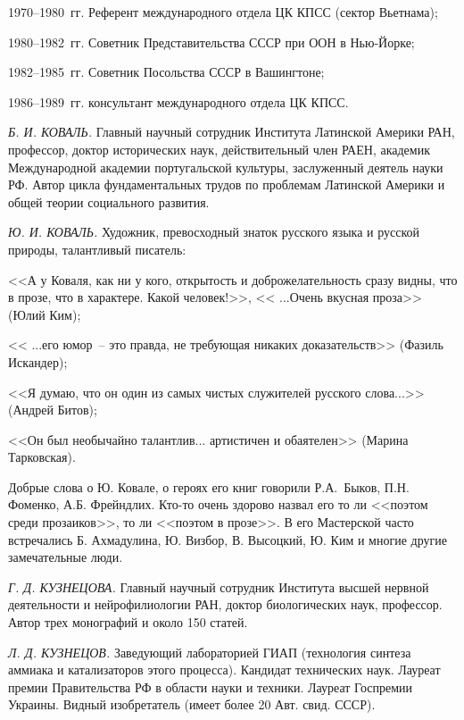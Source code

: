 1970--1980~гг. Референт международного отдела ЦК КПСС (сектор Вьетнама);

1980--1982~гг. Советник  Представительства СССР при ООН в Нью-Йорке;

1982--1985~гг. Советник Посольства СССР в Вашингтоне;

1986--1989~гг. консультант международного отдела ЦК КПСС.

\indent

\textit{Б. И. КОВАЛЬ.} Главный научный сотрудник Института Латинской Америки РАН, профессор, доктор исторических наук, действительный член РАЕН, академик Международной академии португальской культуры, заслуженный деятель науки РФ. Автор цикла фундаментальных трудов по проблемам Латинской Америки и общей теории социального развития.

\indent

\textit{Ю. И. КОВАЛЬ.} Художник, превосходный знаток русского языка и русской природы, талантливый писатель:

<<А у Коваля, как ни у кого, открытость и доброжелательность сразу видны, что в прозе, что в характере. Какой человек!>>, << ...Очень вкусная проза>> (Юлий Ким);

<< ...его юмор~-- это правда, не требующая никаких доказательств>> (Фазиль Искандер);

<<Я думаю, что он один из самых чистых служителей русского слова...>> (Андрей Битов);

<<Он был необычайно талантлив... артистичен и обаятелен>> (Марина Тарковская).

Добрые слова о Ю. Ковале, о героях его книг говорили Р.А.~Быков, П.Н. Фоменко, А.Б. Фрейндлих. Кто-то очень здорово назвал его то ли <<поэтом среди прозаиков>>, то ли <<поэтом в прозе>>. В его Мастерской часто встречались Б. Ахмадулина, Ю. Визбор, В. Высоцкий, Ю. Ким  и многие другие замечательные люди.

\indent

\textit{Г. Д. КУЗНЕЦОВА.} Главный научный сотрудник Института высшей нервной деятельности и нейрофилиологии РАН, доктор биологических наук, профессор. Автор трех монографий и около 150 статей.

\indent

\textit{Л. Д. КУЗНЕЦОВ.} Заведующий лабораторией ГИАП (технология синтеза аммиака и катализаторов этого процесса). Кандидат технических наук. Лауреат премии Правительства РФ в области науки и техники. Лауреат Госпремии Украины. Видный изобретатель (имеет более 20 Авт. свид. СССР).

